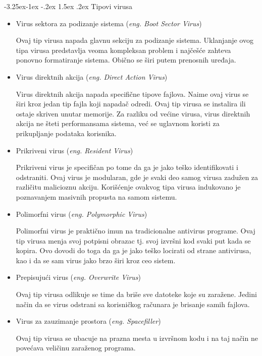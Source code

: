 \documentclass[a4paper]{article}
\makeatletter
\renewcommand\paragraph{\@startsection{paragraph}{4}{\z@}%
   {-3.25ex\@plus -1ex \@minus -.2ex}%
   {1.5ex \@plus .2ex}%
   {\normalfont\normalsize\bfseries}}
\makeatother
\begin{document}
\paragraph{Tipovi virusa}
\begin{itemize}
\item Virus sektora za podizanje sistema (\textit{eng. Boot Sector Virus})

Ovaj tip virusa napada glavnu sekciju za podizanje sistema. Uklanjanje ovog tipa virusa predstavlja veoma kompleksan problem i najčešće zahteva ponovno formatiranje sistema. Obično se širi putem prenosnih uređaja. 


\item Virus direktnih akcija (\textit{eng. Direct Action Virus})

Virus direktnih akcija napada specifične tipove fajlova. Naime ovaj virus se širi kroz jedan tip fajla koji napadač odredi. Ovaj tip virusa se instalira ili ostaje skriven unutar memorije. Za razliku od većine virusa, virus direktnih akcija ne šteti performansama sistema, već se uglavnom koristi za prikupljanje podataka korisnika.


\item Prikriveni virus (\textit{eng. Resident Virus})

Prikriveni virus je specifičan po tome da ga je jako teško identifikovati i odstraniti. Ovaj virus je modularan, gde je svaki deo samog virusa zadužen za različitu malicioznu akciju. Korišćenje ovakvog tipa virusa indukovano je poznavanjem masivnih propusta na samom sistemu.

\item Polimorfni virus (\textit{eng. Polymorphic Virus})

Polimorfni virus je praktično imun na tradicionalne antivirus programe. Ovaj tip virusa menja svoj potpisni obrazac tj. svoj izvršni kod svaki put kada se kopira. Ovo dovodi do toga da ga je jako teško locirati od strane antivirusa, kao i da se sam virus jako brzo širi kroz ceo sistem.

\item Prepisujući virus (\textit{eng. Overwrite Virus})

Ovaj tip virusa odlikuje se time da briše sve datoteke koje su zaražene. Jedini način da se virus odstrani sa korisničkog računara je brisanje samih fajlova. 

\item Virus za zauzimanje prostora (\textit{eng. Spacefiller})

Ovaj tip virusa se ubacuje na prazna mesta u izvršnom kodu i na taj način ne povećava veličinu zaraženog programa.

\end{itemize}
\end{document}
